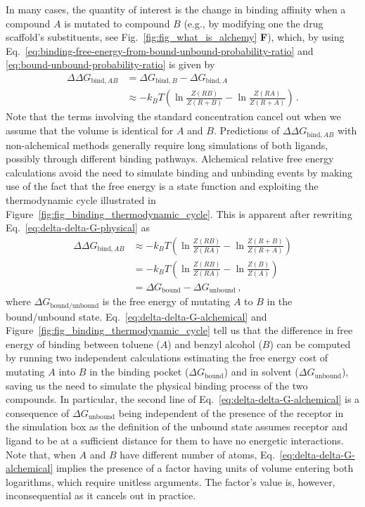 \documentclass[9pt,bestpractices]{livecoms}
\begin{document}
In many cases, the quantity of interest is the change in binding affinity when a compound $A$ is mutated to compound $B$ (e.g., by modifying one the drug scaffold's substituents, see Fig.~\ref{fig:fig_what_is_alchemy} \textbf{F}), which, by using Eq.~\ref{eq:binding-free-energy-from-bound-unbound-probability-ratio} and \ref{eq:bound-unbound-probability-ratio} is given by
\begin{equation}\label{eq:delta-delta-G-physical}
\begin{split}
    \Delta \Delta G_{\mathrm{bind}, AB} &= \Delta G_{\mathrm{bind}, B} - \Delta G_{\mathrm{bind}, A} \\
    &\approx -k_BT \left( \ln \frac{Z(RB)}{Z(R+B)} - \ln \frac{Z(RA)}{Z(R+A)} \right) \, .
\end{split}
\end{equation}
Note that the terms involving the standard concentration cancel out when we assume that the volume is identical for $A$ and $B$.
Predictions of $\Delta \Delta G_{\mathrm{bind}, AB}$ with non-alchemical methods generally require long simulations of both ligands, possibly through different binding pathways.
Alchemical relative free energy calculations avoid the need to simulate binding and unbinding events by making use of the fact that the free energy is a state function and exploiting the thermodynamic cycle illustrated in Figure~\ref{fig:fig_binding_thermodynamic_cycle}.
This is apparent after rewriting Eq.~\ref{eq:delta-delta-G-physical} as
\begin{equation}\label{eq:delta-delta-G-alchemical}
\begin{split}
    \Delta \Delta G_{\mathrm{bind}, AB} &\approx -k_BT \left( \ln \frac{Z(RB)}{Z(RA)} - \ln \frac{Z(R+B)}{Z(R+A)} \right) \\
    &= -k_BT \left( \ln \frac{Z(RB)}{Z(RA)} - \ln \frac{Z(B)}{Z(A)} \right) \\
    &= \Delta G_{\mathrm{bound}} - \Delta G_{\mathrm{unbound}} \, ,
\end{split}
\end{equation}
where $\Delta G_{\mathrm{bound/unbound}}$ is the free energy of mutating $A$ to $B$ in the bound/unbound state.
Eq.~\ref{eq:delta-delta-G-alchemical} and Figure~\ref{fig:fig_binding_thermodynamic_cycle} tell us that the difference in free energy of binding between toluene ($A$) and benzyl alcohol ($B$) can be computed by running two independent calculations estimating the free energy cost of mutating $A$ into $B$ in the binding pocket ($\Delta G_{\mathrm{bound}}$) and in solvent ($\Delta G_{\mathrm{unbound}}$), saving us the need to simulate the physical binding process of the two compounds.
In particular, the second line of Eq.~\ref{eq:delta-delta-G-alchemical} is a consequence of $\Delta G_{\mathrm{unbound}}$ being independent of the presence of the receptor in the simulation box as the definition of the unbound state assumes receptor and ligand to be at a sufficient distance for them to have no energetic interactions.
Note that, when $A$ and $B$ have different number of atoms, Eq.~\ref{eq:delta-delta-G-alchemical} implies the presence of a factor having units of volume entering both logarithms, which require unitless arguments.
The factor's value is, however, inconsequential as it cancels out in practice.
\end{document}
